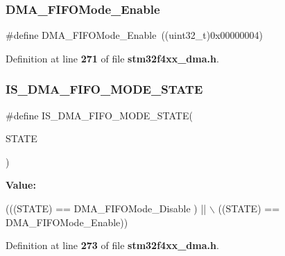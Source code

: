 \subsubsection{D\+M\+A\+\_\+\+F\+I\+F\+O\+Mode\+\_\+\+Enable}
{\footnotesize\ttfamily \#define D\+M\+A\+\_\+\+F\+I\+F\+O\+Mode\+\_\+\+Enable~((uint32\+\_\+t)0x00000004)}



Definition at line \textbf{ 271} of file \textbf{ stm32f4xx\+\_\+dma.\+h}.

\mbox{\label{group__DMA__fifo__direct__mode_gadb90a893aeb49fd4bc14af750af3837c}} 
\subsubsection{I\+S\+\_\+\+D\+M\+A\+\_\+\+F\+I\+F\+O\+\_\+\+M\+O\+D\+E\+\_\+\+S\+T\+A\+TE}
{\footnotesize\ttfamily \#define I\+S\+\_\+\+D\+M\+A\+\_\+\+F\+I\+F\+O\+\_\+\+M\+O\+D\+E\+\_\+\+S\+T\+A\+TE(\begin{DoxyParamCaption}\item[{}]{S\+T\+A\+TE }\end{DoxyParamCaption})}

{\bfseries Value\+:}
\begin{DoxyCode}
(((STATE) == DMA_FIFOMode_Disable ) || \(\backslash\)
                                       ((STATE) == DMA_FIFOMode_Enable))
\end{DoxyCode}


Definition at line \textbf{ 273} of file \textbf{ stm32f4xx\+\_\+dma.\+h}.

